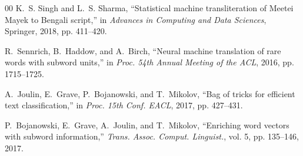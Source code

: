 \documentclass[conference]{IEEEtran}
\begin{document}
\begin{thebibliography}{00}
K.~S. Singh and L.~S. Sharma, ``Statistical machine transliteration of Meetei Mayek to Bengali script,'' in \emph{Advances in Computing and Data Sciences}, Springer, 2018, pp. 411--420.

R.~Sennrich, B.~Haddow, and A.~Birch, ``Neural machine translation of rare words with subword units,'' in \emph{Proc. 54th Annual Meeting of the ACL}, 2016, pp. 1715--1725.

A.~Joulin, E.~Grave, P.~Bojanowski, and T.~Mikolov, ``Bag of tricks for efficient text classification,'' in \emph{Proc. 15th Conf. EACL}, 2017, pp. 427--431.

P.~Bojanowski, E.~Grave, A.~Joulin, and T.~Mikolov, ``Enriching word vectors with subword information,'' \emph{Trans. Assoc. Comput. Linguist.}, vol. 5, pp. 135--146, 2017.

\end{thebibliography}
\end{document}
